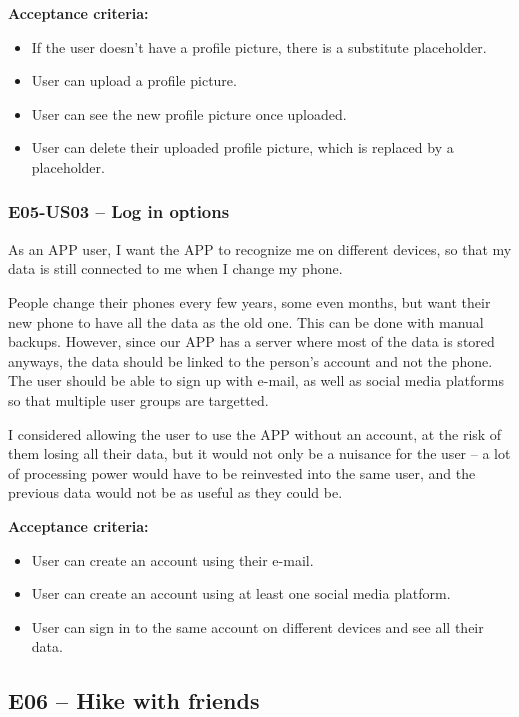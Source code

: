 \textbf{Acceptance criteria:}
\begin{itemize}
    \item If the user doesn't have a profile picture, there is a substitute placeholder.
    \item User can upload a profile picture.
    \item User can see the new profile picture once uploaded.
    \item User can delete their uploaded profile picture, which is replaced by a placeholder.
\end{itemize}

\subsubsection*{E05-US03 -- Log in options}
As an APP user, I want the APP to recognize me on different devices, so that my data is still connected to me when I change my phone.

People change their phones every few years, some even months, but want their new phone to have all the data as the old one.
This can be done with manual backups.
However, since our APP has a server where most of the data is stored anyways, the data should be linked to the person's account and not the phone.
The user should be able to sign up with e-mail, as well as social media platforms so that multiple user groups are targetted.

I considered allowing the user to use the APP without an account, at the risk of them losing all their data, but it would not only be a nuisance for the user --
a lot of processing power would have to be reinvested into the same user, and the previous data would not be as useful as they could be.

\textbf{Acceptance criteria:}
\begin{itemize}
    \item User can create an account using their e-mail.
    \item User can create an account using at least one social media platform.
    \item User can sign in to the same account on different devices and see all their data.
\end{itemize}


\subsection*{E06 -- Hike with friends}

